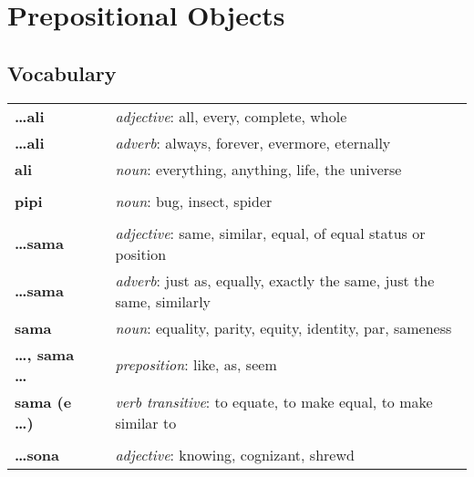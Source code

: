 
\section{Prepositional Objects}
\subsection*{Vocabulary}

\begin{supertabular}{p{2,5cm}|ll}
    \textbf{\dots ali}           &  & \textit{adjective}: all, every, complete, whole                               \\
    \textbf{\dots ali}           &  & \textit{adverb}: always, forever, evermore, eternally                         \\
    \textbf{ali}                 &  & \textit{noun}: everything, anything, life, the universe                       \\
                                 &  &                                                                               \\
    \textbf{pipi}                &  & \textit{noun}: bug, insect, spider                                            \\
                                 &  &                                                                               \\
    \textbf{\dots sama}          &  & \textit{adjective}: same, similar, equal, of equal status or position         \\
    \textbf{\dots sama}          &  & \textit{adverb}: just as, equally, exactly the same, just the same, similarly \\
    \textbf{sama}                &  & \textit{noun}: equality, parity, equity, identity, par, sameness              \\
    \textbf{\dots , sama \dots}  &  & \textit{preposition}: like, as, seem                                          \\
    \textbf{sama (e \dots)}      &  & \textit{verb transitive}: to equate, to make equal, to make similar to        \\
                                 &  &                                                                               \\
    \textbf{\dots sona}          &  & \textit{adjective}: knowing, cognizant, shrewd                                \\

\end{supertabular}

